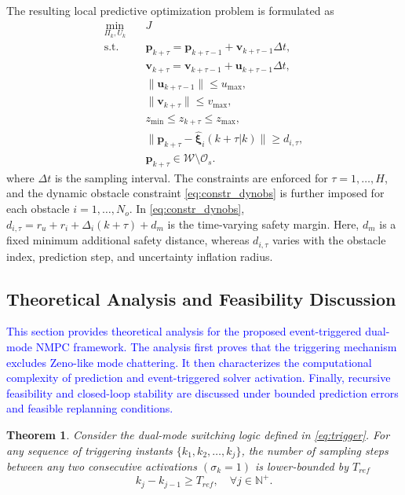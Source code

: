 \documentclass[lettersize,journal]{IEEEtran}
\newtheorem{theorem}{Theorem}
\newcommand{\vect}[1]{\boldsymbol{#1}}
\begin{document}
The resulting local predictive optimization problem is formulated as
\begin{subequations} 
	\label{eq:opt_problem}
	\begin{align}
		\min_{\Pi_k, U_k} \quad & J 
		\label{eq:obj} \\
		\text{s.t.} \quad 
		& \vect{p}_{k+\tau} = \vect{p}_{k+\tau-1} 
		+ \vect{v}_{k+\tau-1}\Delta t, 
		\label{eq:dyn1} \\
		& \vect{v}_{k+\tau} = \vect{v}_{k+\tau-1} 
		+ \vect{u}_{k+\tau-1}\Delta t, 
		\label{eq:dyn2} \\
		& \|\vect{u}_{k+\tau-1}\| \le u_{\max}, 
		\label{eq:constr_u} \\
		& \|\vect{v}_{k+\tau}\| \le v_{\max}, 
		\label{eq:constr_v} \\
		& z_{\min} \le z_{k+\tau} \le z_{\max}, 
		\label{eq:constr_z} \\
		& \|\vect{p}_{k+\tau} - \hat{\vect{\xi}}_i(k+\tau|k)\| 
		\ge d_{i,\tau}, 
		\label{eq:constr_dynobs} \\
		& \vect{p}_{k+\tau} \in \mathcal{W} \setminus \mathcal{O}_s.
		\label{eq:constr_staticobs}
	\end{align}
\end{subequations}
where $\Delta t$ is the sampling interval. The constraints are enforced for $\tau=1,\ldots,H$, and the dynamic obstacle constraint \eqref{eq:constr_dynobs} is further imposed for each obstacle $i=1,\ldots,N_o$. In \eqref{eq:constr_dynobs}, $d_{i,\tau}=r_u+r_i+\Delta_i(k+\tau)+d_m$ is the time-varying safety margin. Here, $d_m$ is a fixed minimum additional safety distance, whereas $d_{i,\tau}$ varies with the obstacle index, prediction step, and uncertainty inflation radius.

\subsection{Theoretical Analysis and Feasibility Discussion}

\textcolor{blue}{This section provides theoretical analysis for the proposed event-triggered dual-mode NMPC framework. The analysis first proves that the triggering mechanism excludes Zeno-like mode chattering. It then characterizes the computational complexity of prediction and event-triggered solver activation. Finally, recursive feasibility and closed-loop stability are discussed under bounded prediction errors and feasible replanning conditions.}

\begin{theorem}
	Consider the dual-mode switching logic defined in \eqref{eq:trigger}. For any sequence of triggering instants $\{k_1, k_2, \dots, k_j\}$, the number of sampling steps between any two consecutive activations $(\sigma_k = 1)$ is lower-bounded by $T_{ref}$
	\begin{equation}
		k_j - k_{j-1} \ge T_{ref}, \quad \forall j \in \mathbb{N}^{+}.
		\label{eq:theorem1_result}
	\end{equation}
\end{theorem}
\end{document}
